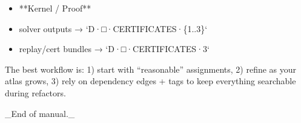 \documentclass[11pt]{article}
\begin{document}
\begin{itemize}
\item **Kernel / Proof**
\item solver outputs → `D·□·CERTIFICATES·\{1..3\}`
\item replay/cert bundles → `D·□·CERTIFICATES·3`
\end{itemize}

The best workflow is:
1) start with “reasonable” assignments,  
2) refine as your atlas grows,  
3) rely on dependency edges + tags to keep everything searchable during refactors.



\_End of manual.\_
\end{document}
